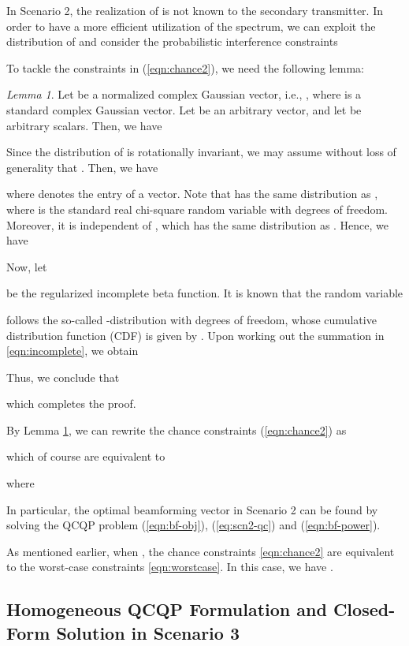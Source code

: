 \documentclass[twocolumn,10pt]{IEEEtran}
\theoremstyle{plain} \newtheorem{theorem}{Theorem}
\theoremstyle{plain} \newtheorem{proposition}{Proposition}
\theoremstyle{plain} \newtheorem{corollary}{Corollary}
\theoremstyle{remark} \newtheorem{remark}{Remark}
\theoremstyle{remark} \newtheorem{lemma}{Lemma}
\theoremstyle{plain} \newtheorem{definition}{Definition}
\theoremstyle{plain} \newtheorem{assumption}{Assumption}
\theoremstyle{plain} \newtheorem{fact}{Fact}
\begin{document}
In Scenario 2, the realization of  is not known to the secondary transmitter.  In order to have a more efficient utilization of the spectrum, we can exploit the distribution of  and consider the probabilistic interference constraints

To tackle the constraints in (\ref{eqn:chance2}), we need the following lemma:
\begin{lemma}\label{lem:scn2-F}
   Let  be a normalized complex Gaussian vector, i.e., , where  is a standard complex Gaussian vector.  Let  be an arbitrary vector, and let  be arbitrary scalars.  Then, we have
   
\end{lemma}
  Since the distribution of  is rotationally invariant, we may assume without loss of generality that . Then, we have

where  denotes the  entry of a vector. Note that  has the same distribution as , where  is the standard real chi-square random variable with  degrees of freedom.  Moreover, it is independent of , which has the same distribution as .  Hence, we have

Now, let

be the regularized incomplete beta function.  It is known that the random variable

follows the so-called -distribution with  degrees of freedom, whose cumulative distribution function (CDF) is given by .  Upon working out the summation in \eqref{eqn:incomplete}, we obtain

Thus, we conclude that

which completes the proof.


By Lemma \ref{lem:scn2-F}, we can rewrite the chance constraints (\ref{eqn:chance2}) as

which of course are equivalent to

where

In particular, the optimal beamforming vector  in Scenario 2 can be found by solving the QCQP problem (\ref{eqn:bf-obj}), (\ref{eq:scn2-qc}) and (\ref{eqn:bf-power}).

As mentioned earlier, when , the chance constraints \eqref{eqn:chance2} are equivalent to the worst-case constraints \eqref{eqn:worstcase}. In this case, we have .

\subsection{Homogeneous QCQP Formulation and Closed-Form Solution in Scenario 3}\label{subsection:3-4}
\end{document}
